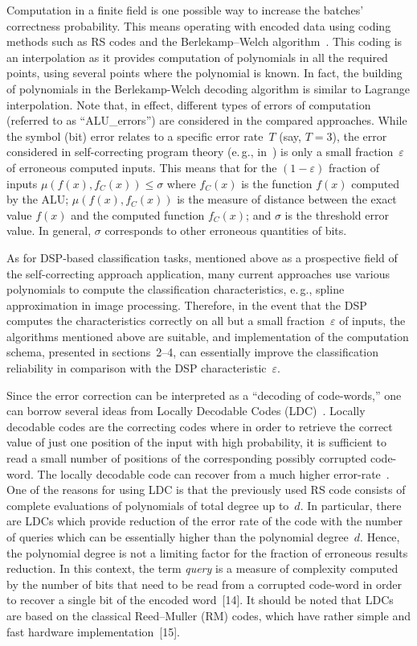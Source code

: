 \begin{multicols}{2}
    Computation in a finite field is one possible way to increase the batches' correctness probability. This means 
operating with encoded data using coding methods such as RS codes and the Berlekamp--Welch 
algorithm~\cite{7-dol}. This coding is an interpolation as it provides computation of polynomials in all the required 
points, using several points where the polynomial is known. In fact, the building of polynomials in the Berlekamp-Welch 
decoding algorithm is similar to Lagrange interpolation. Note that, in effect, different types of errors of 
computation (referred to as ``ALU\_errors'') are considered in the compared approaches. While the symbol (bit) error relates to a specific 
error rate~$T$ (say, $T=3$), the error considered in self-correcting program theory (e.\,g., in~\cite{3-dol}) is only a 
small fraction~$\varepsilon$ of erroneous computed  inputs. This means that  for the $(1-\varepsilon)$ fraction of 
inputs $\mu(f(x),f_C(x))\leq \sigma$ where $f_C(x)$ is the function $f(x)$ computed by the ALU;
$\mu (f(x), f_C(x))$ 
is the measure of distance between the exact value $f(x)$ and the computed function $f_C(x)$;
and $\sigma$ is the threshold 
error value. In general, $\sigma$ corresponds to other erroneous quantities of bits. 
    
     As for DSP-based classification tasks, mentioned above as a prospective field of the self-correcting approach 
application, many current approaches use various polynomials to compute the classification characteristics, e.\,g., spline 
approximation in image processing. Therefore, in the event that the DSP computes the characteristics correctly on all but 
a small fraction~$\varepsilon$ of inputs, the algorithms mentioned above are suitable, and implementation of the 
computation schema, presented in sections~2--4, can essentially improve the classification reliability in comparison with the 
DSP characteristic~$\varepsilon$.
     
Since the error correction can be interpreted as a ``decoding of code-words,'' one can 
borrow  several ideas from Locally 
Decodable Codes (LDC)~\cite{13-dol}. Locally decodable codes are the correcting codes where in order to retrieve the correct value of 
just one position of the input with high probability, it is sufficient to read a small number of positions of the 
corresponding possibly corrupted code-word. The locally decodable code can recover from a much higher 
     error-rate~\cite{4-dol}. One of the reasons for using LDC is that the previously used RS code consists 
of complete evaluations of polynomials of total degree up to~$d$. In particular, there are LDCs which provide reduction 
of the error rate of the code with the number of queries which can be essentially 
higher than the polynomial degree~$d$. 
Hence, the polynomial 
degree is not a limiting factor for the fraction of erroneous results reduction. 
In this context, the term \textit{query} is a measure of complexity computed by the
number of bits that need to be read from a corrupted code-word in order to recover
a single bit of the encoded word~[14]. It should be noted that LDCs are based on the classical Reed--Muller
(RM) codes, which have rather simple and fast hardware implementation~[15].
     

\end{multicols}
